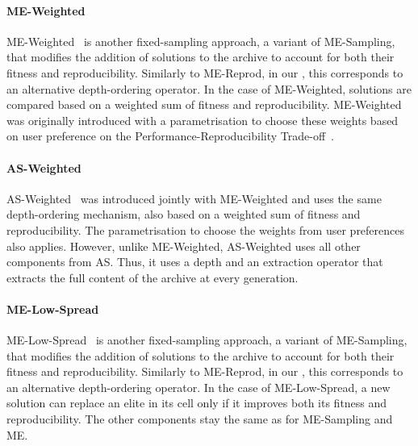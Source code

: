 \paragraph{ME-Weighted}
ME-Weighted~\cite{flageat2024exploring} is another fixed-sampling approach, a variant of ME-Sampling, that modifies the addition of solutions to the archive to account for both their fitness and reproducibility. 
Similarly to ME-Reprod, in our \framework{}, this corresponds to an alternative depth-ordering operator. In the case of ME-Weighted, solutions are compared based on a weighted sum of fitness and reproducibility. 
ME-Weighted was originally introduced with a parametrisation to choose these weights based on user preference on the Performance-Reproducibility Trade-off~\cite{flageat2024exploring}.


\paragraph{AS-Weighted}
AS-Weighted~\cite{flageat2024exploring} was introduced jointly with ME-Weighted and uses the same depth-ordering mechanism, also based on a weighted sum of fitness and reproducibility. The parametrisation to choose the weights from user preferences also applies. 
However, unlike ME-Weighted, AS-Weighted uses all other components from AS. Thus, it uses a depth and an extraction operator that extracts the full content of the archive at every generation. 


\paragraph{ME-Low-Spread}
ME-Low-Spread~\cite{mace2023quality} is another fixed-sampling approach, a variant of ME-Sampling, that modifies the addition of solutions to the archive to account for both their fitness and reproducibility. 
Similarly to ME-Reprod, in our \framework{}, this corresponds to an alternative depth-ordering operator. 
In the case of ME-Low-Spread, a new solution can replace an elite in its cell only if it improves both its fitness and reproducibility. 
The other components stay the same as for ME-Sampling and ME. 


